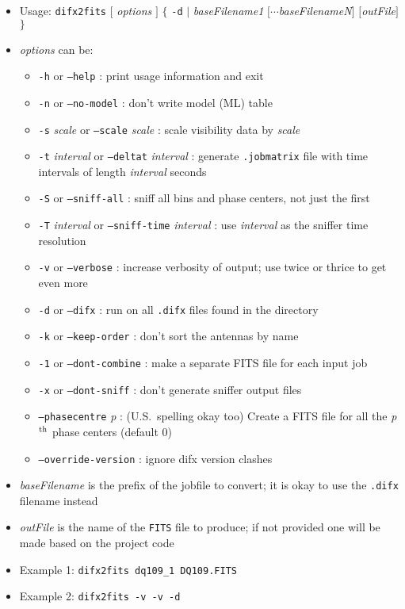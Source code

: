 \begin{itemize}
\item[] Usage: {\tt difx2fits} $[$ {\em options} $]$ $\{$ {\tt -d} $\mid$ {\em baseFilename1} $[\cdots${\em baseFilenameN}$]$ $[${\em outFile}$]$ $\}$
\item[] {\em options} can be:
\begin{itemize}
\item[] {\tt -h} or {\tt --help} : print usage information and exit
\item[] {\tt -n} or {\tt --no-model} : don't write model (ML) table
\item[] {\tt -s} {\em scale} or {\tt --scale} {\em scale} : scale visibility data by {\em scale}
\item[] {\tt -t} {\em interval} or {\tt --deltat} {\em interval} : generate {\tt .jobmatrix} file with time intervals of length {\em interval} seconds
\item[] {\tt -S} or {\tt --sniff-all} : sniff all bins and phase centers, not just the first
\item[] {\tt -T} {\em interval} or {\tt --sniff-time} {\em interval} : use {\em interval} as the sniffer time resolution
\item[] {\tt -v} or {\tt --verbose} : increase verbosity of output; use twice or thrice to get even more
\item[] {\tt -d} or {\tt --difx} : run on all {\tt .difx} files found in the directory
\item[] {\tt -k} or {\tt --keep-order} : don't sort the antennas by name
\item[] {\tt -1} or {\tt --dont-combine} : make a separate FITS file for each input job
\item[] {\tt -x} or {\tt --dont-sniff} : don't generate sniffer output files
\item[] {\tt --phasecentre} {\em p} : (U.S.\ spelling okay too) Create a FITS file for all the {\em p}$^{\rm th}$ phase centers (default 0)
\item[] {\tt --override-version} : ignore difx version clashes
\end{itemize}
\item[] {\em baseFilename} is the prefix of the jobfile to convert; it is okay to use the {\tt .difx} filename instead
\item[] {\em outFile} is the name of the {\tt FITS} file to produce; if not provided one will be made based on the project code
\item[] Example 1: {\tt difx2fits dq109\_1 DQ109.FITS}
\item[] Example 2: {\tt difx2fits -v -v -d}
\end{itemize}

